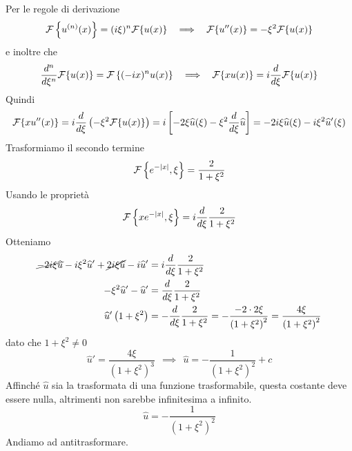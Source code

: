 Per le regole di derivazione
\begin{equation*}
\Fc \left\{u^{(n)}(x)\right\} = (i\xi)^{n}\Fc \{u(x)\} \ \ \implies \ \ \Fc \{u''(x)\} = - \xi^{2}\Fc \{u(x)\}
\end{equation*}
e inoltre che
\begin{equation*}
\frac{d^{n}}{d\xi^{n}}\Fc \{u(x)\} = \Fc \left\{(- ix)^{n} u(x)\right\} \ \ \implies \ \ \Fc \{xu(x)\} = i\frac{d}{d\xi}\Fc \{u(x)\}
\end{equation*}
Quindi
\begin{equation*}
\Fc \{xu''(x)\} = i\frac{d}{d\xi}\left(- \xi^{2}\Fc \{u(x)\}\right) = i\left[ - 2\xi \hat{u}(\xi) - \xi^{2}\frac{d}{d\xi}\hat{u}\right] = - 2i\xi \hat{u}(\xi) - i\xi^{2}\hat{u} '(\xi)
\end{equation*}
Trasformiamo il secondo termine
\begin{equation*}
\Fc \left\{e^{- | x|}, \xi \right\} = \frac{2}{1 + \xi^{2}}
\end{equation*}
Usando le proprietà
\begin{equation*}
\Fc \left\{xe^{- | x|}, \xi \right\} = i\frac{d}{d\xi}\frac{2}{1 + \xi^{2}}
\end{equation*}
Otteniamo
\begin{align*}
\cancel{- 2i\xi \hat{u}} - i\xi^{2}\hat{u} ' + \cancel{2i\xi \hat{u}} - i\hat{u} ' & = i\frac{d}{d\xi}\frac{2}{1 + \xi^{2}}\\
- \xi^{2}\hat{u} ' - \hat{u} ' & = \frac{d}{d\xi}\frac{2}{1 + \xi^{2}}\\
\hat{u} '\left(1 + \xi^{2}\right) & = - \frac{d}{d\xi}\frac{2}{1 + \xi^{2}} = - \frac{- 2 \cdot 2\xi}{\left(1 + \xi^{2}\right)^{2}} = \frac{4\xi}{\left(1 + \xi^{2}\right)^{2}}
\end{align*}
dato che $1 + \xi^{2} \neq 0$
\begin{equation*}
\hat{u} ' = \frac{4\xi}{\left(1 + \xi^{2}\right)^{3}} \ \ \implies \ \ \hat{u} = - \frac{1}{\left(1 + \xi^{2}\right)^{2}} + c
\end{equation*}
Affinché $\hat{u}$ sia la trasformata di una funzione trasformabile, questa costante deve essere nulla, altrimenti non sarebbe infinitesima a infinito.
\begin{equation*}
\hat{u} = - \frac{1}{\left(1 + \xi^{2}\right)^{2}}
\end{equation*}
Andiamo ad antitrasformare.


